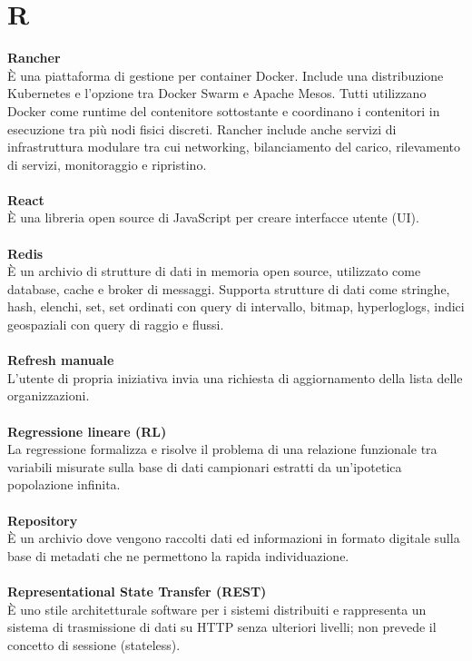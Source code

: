 \section{R}
\textbf{Rancher}\\
È una piattaforma di gestione per container Docker. Include una distribuzione Kubernetes e l'opzione tra Docker Swarm e Apache Mesos. Tutti utilizzano Docker come runtime del contenitore sottostante e coordinano i contenitori in esecuzione tra più nodi fisici discreti. Rancher include anche servizi di infrastruttura modulare tra cui networking, bilanciamento del carico, rilevamento di servizi, monitoraggio e ripristino. \\ \\
\textbf{React}\\
È una libreria open source di JavaScript per creare interfacce utente (UI). \\ \\
\textbf{Redis}\\
È un archivio di strutture di dati in memoria open source, utilizzato come database, cache e broker di messaggi. Supporta strutture di dati come stringhe, hash, elenchi, set, 
set ordinati con query di intervallo, bitmap, hyperloglogs, indici geospaziali con query di raggio e flussi. \\ \\
\textbf{Refresh manuale}\\
L'utente di propria iniziativa invia una richiesta di aggiornamento della lista delle organizzazioni. \\ \\
\textbf{Regressione lineare (RL)}\\
La regressione formalizza e risolve il problema di una relazione funzionale tra variabili misurate sulla base di dati campionari estratti da un'ipotetica popolazione infinita. \\ \\
\textbf{Repository}\\
È un archivio dove vengono raccolti dati ed informazioni in formato digitale sulla base di metadati che ne permettono la rapida individuazione. \\ \\
\textbf{Representational State Transfer (REST)}\\
È uno stile architetturale software per i sistemi distribuiti e rappresenta un sistema di trasmissione di dati su HTTP senza ulteriori livelli; non prevede il concetto di sessione (stateless). \\ \\
